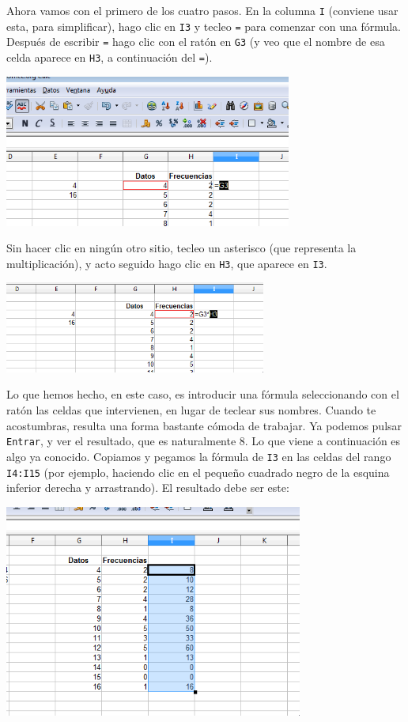 \documentclass[10pt,a4paper]{article}\usepackage[]{graphicx}\usepackage[]{color}
\newcounter {cont01}
\begin{document}
Ahora vamos con el primero de los cuatro pasos. En la columna {\tt I} (conviene usar esta, para simplificar), hago clic en {\tt I3} y tecleo {\tt =} para comenzar con una fórmula. Después de escribir {\tt =} hago clic con el ratón en {\tt G3} (y veo que el nombre de esa celda aparece en {\tt H3}, a continuación del {\tt =}).
    \begin{center}
    \includegraphics[height=5cm]{../fig/Tut01-Calc-Formula-23.png}
    \end{center}
Sin hacer clic en ningún otro sitio, tecleo un asterisco (que representa la multiplicación), y acto seguido hago clic en {\tt H3}, que aparece en {\tt I3}.
    \begin{center}
    \includegraphics[height=3cm]{../fig/Tut01-Calc-Formula-24.png}
    \end{center}
Lo que hemos hecho, en este caso, es introducir una fórmula seleccionando con el ratón las celdas que intervienen, en lugar de teclear sus nombres. Cuando te acostumbras, resulta una forma bastante cómoda de trabajar. Ya podemos pulsar {\tt Entrar}, y ver el resultado, que es naturalmente 8. Lo que viene a continuación es algo ya conocido. Copiamos y pegamos la fórmula de {\tt I3} en las celdas del rango {\tt I4:I15} (por ejemplo, haciendo clic en el pequeño cuadrado negro de la esquina inferior derecha y arrastrando). El resultado debe ser este:
    \begin{center}
    \includegraphics[height=7cm]{../fig/Tut01-Calc-Formula-25.png}
    \end{center}
\end{document}

